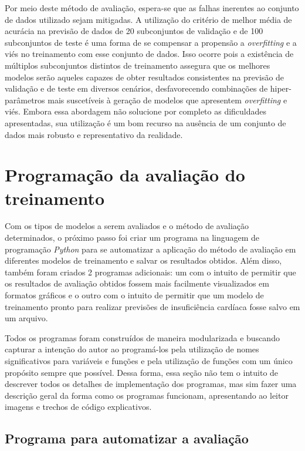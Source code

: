 Por meio deste método de avaliação, espera-se que as falhas inerentes ao conjunto de dados utilizado sejam mitigadas. A utilização do critério de melhor média de acurácia na previsão de dados de 20 subconjuntos de validação e de 100 subconjuntos de teste é uma forma de se compensar a propensão a \textit{overfitting} e a viés no treinamento com esse conjunto de dados. Isso ocorre pois a existência de múltiplos subconjuntos distintos de treinamento assegura que os melhores modelos serão aqueles capazes de obter resultados consistentes na previsão de validação e de teste em diversos cenários, desfavorecendo combinações de hiper-parâmetros mais suscetíveis à geração de modelos que apresentem \textit{overfitting} e viés. Embora essa abordagem não solucione por completo as dificuldades apresentadas, sua utilização é um bom recurso na ausência de um conjunto de dados mais robusto e representativo da realidade.

\section{Programação da avaliação do treinamento}

Com os tipos de modelos a serem avaliados e o método de avaliação determinados, o próximo passo foi criar um programa na linguagem de programação \textit{Python} para se automatizar a aplicação do método de avaliação em diferentes modelos de treinamento e salvar os resultados obtidos. Além disso, também foram criados 2 programas adicionais: um com o intuito de permitir que os resultados de avaliação obtidos fossem mais facilmente visualizados em formatos gráficos e o outro com o intuito de permitir que um modelo de treinamento pronto para realizar previsões de insuficiência cardíaca fosse salvo em um arquivo.

Todos os programas foram construídos de maneira modularizada e buscando capturar a intenção do autor ao programá-los pela utilização de nomes significativos para variáveis e funções e pela utilização de funções com um único propósito sempre que possível. Dessa forma, essa seção não tem o intuito de descrever todos os detalhes de implementação dos programas, mas sim fazer uma descrição geral da forma como os programas funcionam, apresentando ao leitor imagens e trechos de código explicativos.

\subsection{Programa para automatizar a avaliação}

